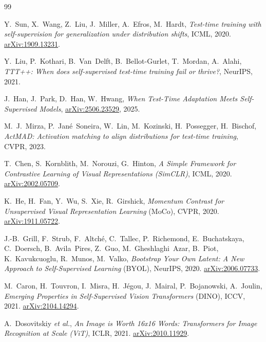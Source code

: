\documentclass[12pt,a4paper]{report}
\begin{document}
	\begin{thebibliography}{99}
		\footnotesize
		
		Y.~Sun, X.~Wang, Z.~Liu, J.~Miller, A.~Efros, M.~Hardt,
		\emph{Test-time training with self-supervision for generalization under distribution shifts},
		ICML, 2020. \href{https://arxiv.org/abs/1909.13231}{arXiv:1909.13231}.
		
		Y.~Liu, P.~Kothari, B.~Van~Delft, B.~Bellot-Gurlet, T.~Mordan, A.~Alahi,
		\emph{TTT++: When does self-supervised test-time training fail or thrive?},
		NeurIPS, 2021.
		
		J.~Han, J.~Park, D.~Han, W.~Hwang,
		\emph{When Test-Time Adaptation Meets Self-Supervised Models},
		\href{https://arxiv.org/abs/2506.23529}{arXiv:2506.23529}, 2025.
		
		M.~J.~Mirza, P.~Jan\'e~Soneira, W.~Lin, M.~Kozinski, H.~Possegger, H.~Bischof,
		\emph{ActMAD: Activation matching to align distributions for test-time training},
		CVPR, 2023.
		
		T.~Chen, S.~Kornblith, M.~Norouzi, G.~Hinton,
		\emph{A Simple Framework for Contrastive Learning of Visual Representations (SimCLR)},
		ICML, 2020. \href{https://arxiv.org/abs/2002.05709}{arXiv:2002.05709}.
		
		K.~He, H.~Fan, Y.~Wu, S.~Xie, R.~Girshick,
		\emph{Momentum Contrast for Unsupervised Visual Representation Learning} (MoCo),
		CVPR, 2020. \href{https://arxiv.org/abs/1911.05722}{arXiv:1911.05722}.
		
		J.-B.~Grill, F.~Strub, F.~Altch\'e, C.~Tallec, P.~Richemond, E.~Buchatskaya, C.~Doersch, B.~Avila~Pires, Z.~Guo, M.~Gheshlaghi~Azar, B.~Piot, K.~Kavukcuoglu, R.~Munos, M.~Valko,
		\emph{Bootstrap Your Own Latent: A New Approach to Self-Supervised Learning} (BYOL),
		NeurIPS, 2020. \href{https://arxiv.org/abs/2006.07733}{arXiv:2006.07733}.
		
		M.~Caron, H.~Touvron, I.~Misra, H.~J\'egou, J.~Mairal, P.~Bojanowski, A.~Joulin,
		\emph{Emerging Properties in Self-Supervised Vision Transformers} (DINO),
		ICCV, 2021. \href{https://arxiv.org/abs/2104.14294}{arXiv:2104.14294}.
		
		
		A.~Dosovitskiy \emph{et al.},
		\emph{An Image is Worth 16x16 Words: Transformers for Image Recognition at Scale (ViT)},
		ICLR, 2021. \href{https://arxiv.org/abs/2010.11929}{arXiv:2010.11929}.
		

\end{thebibliography}
\end{document}

